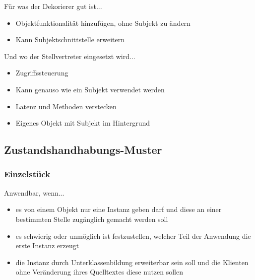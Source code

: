 
Für was der Dekorierer gut ist...
\begin{itemize}
    \item Objektfunktionalität hinzufügen, ohne Subjekt zu ändern
    \item Kann Subjektschnittstelle erweitern
\end{itemize}

Und wo der Stellvertreter eingesetzt wird...
\begin{itemize}
    \item Zugriffssteuerung
    \item Kann genauso wie ein Subjekt verwendet werden
    \item Latenz und Methoden verstecken
    \item Eigenes Objekt mit Subjekt im Hintergrund
\end{itemize}

\newpage
\subsection{Zustandshandhabungs-Muster}


\subsubsection{Einzelstück}



Anwendbar, wenn...
\begin{itemize}
    \item es von einem Objekt nur eine Instanz geben darf und diese an einer bestimmten Stelle zugänglich gemacht werden soll
    \item es schwierig oder unmöglich ist festzustellen, welcher Teil der Anwendung die erste Instanz erzeugt
    \item die Instanz durch Unterklassenbildung erweiterbar sein soll und die Klienten ohne Veränderung ihres Quelltextes diese nutzen sollen
\end{itemize}


